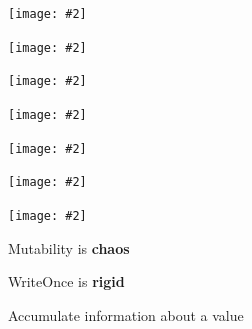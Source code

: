 \documentclass[UKenglish,usenames,dvipsnames,svgnames,table,aspectratio=169,mathserif]{beamer}
\newcommand{\nl}{\vspace{\baselineskip}}
\newcommand{\pnl}{\pause \nl}
\newcommand{\imageslide}[2][1]{{
\begin{frame}\begin{center}
\texttt{[image: \#2]}
\end{center}\end{frame}
}}
\begin{document}
\imageslide{oscillator-fixed1.pdf}
\imageslide{oscillator-fixed2.pdf}
\imageslide{oscillator-fixed3.pdf}
\imageslide{oscillator-fixed4.pdf}
\imageslide{oscillator-fixed5.pdf}
\imageslide{oscillator-fixed6.pdf}
\imageslide{oscillator-fixed7.pdf}


\begin{frame}

\centering \LARGE

Mutability is {\bf chaos}

\nl
WriteOnce is {\bf rigid}
\end{frame}


\begin{frame}[fragile]

\LARGE
\begin{center}
Accumulate information about a value


\end{center}
\end{frame}









\end{document}
